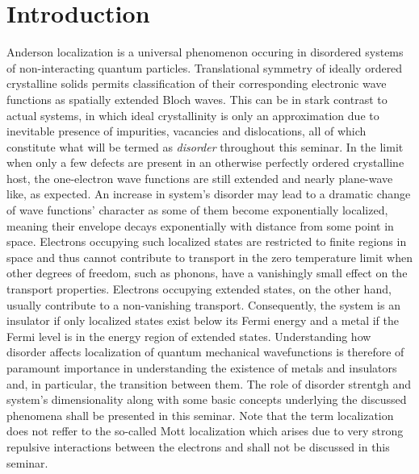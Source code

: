 \documentclass[10pt,a4paper]{article}
\begin{document}
\section{Introduction}
Anderson localization is a universal phenomenon occuring in disordered systems of non-interacting quantum particles. Translational symmetry of ideally ordered crystalline solids permits classification of their corresponding electronic wave functions as spatially extended Bloch waves. This can be in stark contrast to actual systems, in which ideal crystallinity is only an approximation due to inevitable presence of impurities, vacancies and dislocations, all of which constitute what will be termed as \emph{disorder} throughout this seminar. In the limit when only a few defects are present in an otherwise perfectly ordered crystalline host, the one-electron wave functions are still extended and nearly plane-wave like, as expected. An increase in system's disorder may lead to a dramatic change of wave functions' character as some of them become exponentially localized, meaning their envelope decays exponentially with distance from some point in space. Electrons occupying such localized states are restricted to finite regions in space and thus cannot contribute to transport in the zero temperature limit when other degrees of freedom, such as phonons, have a vanishingly small effect on the transport properties. Electrons 
occupying extended states, on the other hand, usually contribute to a non-vanishing transport. Consequently, the system is an insulator if only localized states exist below its Fermi energy and a metal if the Fermi level is in the energy region of extended states. Understanding how disorder affects localization of quantum mechanical wavefunctions is therefore of paramount importance in understanding the existence of metals and insulators and, in particular, the transition between them. The role of disorder strentgh and system's dimensionality along with some basic concepts underlying the discussed phenomena shall be presented in this seminar. Note that the term localization does not reffer to the so-called Mott localization which arises  due to very strong repulsive interactions between the electrons and shall not be discussed in this seminar. \\\\
\noindent 
\end{document}
